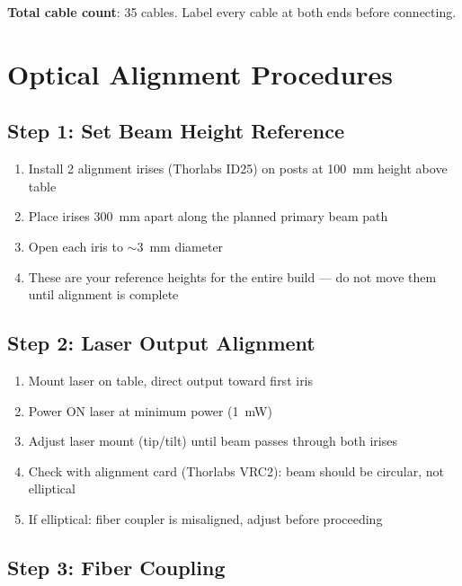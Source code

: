 \documentclass[11pt,a4paper,openany]{book}
\begin{document}
\noindent
\textbf{Total cable count}: 35 cables. Label every cable at both ends before connecting.


\chapter{Optical Alignment Procedures}\label{ch:alignment}


\section{Step 1: Set Beam Height Reference}

\begin{enumerate}[nosep]
  \item Install 2 alignment irises (Thorlabs ID25) on posts at 100~mm height above table
  \item Place irises 300~mm apart along the planned primary beam path
  \item Open each iris to ${\sim}3$~mm diameter
  \item These are your reference heights for the entire build --- do not move them until alignment is complete
\end{enumerate}

\section{Step 2: Laser Output Alignment}

\begin{enumerate}[nosep]
  \item Mount laser on table, direct output toward first iris
  \item Power ON laser at minimum power (1~mW)
  \item Adjust laser mount (tip/tilt) until beam passes through both irises
  \item Check with alignment card (Thorlabs VRC2): beam should be circular, not elliptical
  \item If elliptical: fiber coupler is misaligned, adjust before proceeding
\end{enumerate}

\section{Step 3: Fiber Coupling}
\end{document}
